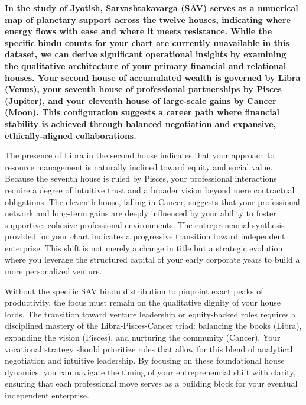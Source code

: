 {\fontsize{9.5}{13.8}\selectfont\bfseries\color{DeepSlate} In the study of Jyotish, Sarvashtakavarga (SAV) serves as a numerical map of planetary support across the twelve houses, indicating where energy flows with ease and where it meets resistance. While the specific bindu counts for your chart are currently unavailable in this dataset, we can derive significant operational insights by examining the qualitative architecture of your primary financial and relational houses. Your second house of accumulated wealth is governed by Libra (Venus), your seventh house of professional partnerships by Pisces (Jupiter), and your eleventh house of large-scale gains by Cancer (Moon). This configuration suggests a career path where financial stability is achieved through balanced negotiation and expansive, ethically-aligned collaborations.}\par\vspace{2mm}

{\fontsize{9}{13}\selectfont The presence of Libra in the second house indicates that your approach to resource management is naturally inclined toward equity and social value. Because the seventh house is ruled by Pisces, your professional interactions require a degree of intuitive trust and a broader vision beyond mere contractual obligations. The eleventh house, falling in Cancer, suggests that your professional network and long-term gains are deeply influenced by your ability to foster supportive, cohesive professional environments. The entrepreneurial synthesis provided for your chart indicates a progressive transition toward independent enterprise. This shift is not merely a change in title but a strategic evolution where you leverage the structured capital of your early corporate years to build a more personalized venture.}\par\vspace{1.8mm}

{\fontsize{9}{13}\selectfont Without the specific SAV bindu distribution to pinpoint exact peaks of productivity, the focus must remain on the qualitative dignity of your house lords. The transition toward venture leadership or equity-backed roles requires a disciplined mastery of the Libra-Pisces-Cancer triad: balancing the books (Libra), expanding the vision (Pisces), and nurturing the community (Cancer). Your vocational strategy should prioritize roles that allow for this blend of analytical negotiation and intuitive leadership. By focusing on these foundational house dynamics, you can navigate the timing of your entrepreneurial shift with clarity, ensuring that each professional move serves as a building block for your eventual independent enterprise.}\par\vspace{1.8mm}

